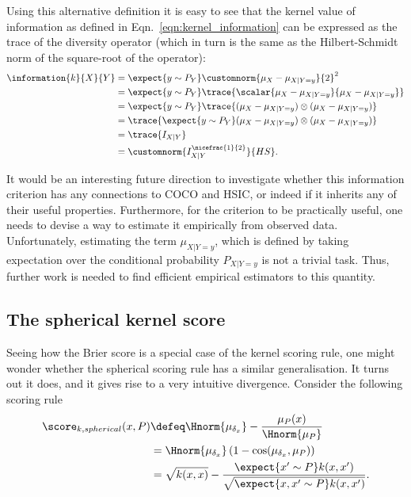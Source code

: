 Using this alternative definition it is easy to see that the kernel value of information as defined in Eqn.\ \eqref{eqn:kernel_information} can be expressed as the trace of the diversity operator (which in turn is the same as the Hilbert-Schmidt norm of the square-root of the operator):
%
\begin{align}
	\information{k}{X}{Y} &= \expect{y \sim P_{Y}} \customnorm{\mu_X - \mu_{X\vert Y=y}}{2}^2\\
		&= \expect{y \sim P_{Y}} \trace{\scalar{\mu_X - \mu_{X\vert Y=y}}{\mu_X - \mu_{X\vert Y=y}}}\\
		&= \expect{y \sim P_{Y}} \trace{ ( \mu_X - \mu_{X\vert Y=y}) \otimes (\mu_X - \mu_{X\vert Y=y})}\\
		&= \trace{ \expect{y \sim P_{Y}} ( \mu_X - \mu_{X\vert Y=y}) \otimes (\mu_X - \mu_{X\vert Y=y})} \\
		&= \trace{I_{X\vert Y}}\\
		&= \customnorm{I_{X\vert Y}^{\nicefrac{1}{2}}}{HS}.
\end{align}

It would be an interesting future direction to investigate whether this information criterion has any connections to COCO and HSIC, or indeed if it inherits any of their useful properties. Furthermore, for the criterion to be practically useful, one needs to devise a way to estimate it empirically from observed data. Unfortunately, estimating the term $\mu_{X\vert Y=y}$, which is defined by taking expectation over the conditional probability $P_{X\vert Y=y}$ is not a trivial task. Thus, further work is needed to find efficient empirical estimators to this quantity.

\subsection{The spherical kernel score\label{sec:spherical_kernel_score}}

Seeing how the Brier score is a special case of the kernel scoring rule, one might wonder whether the spherical scoring rule has a similar generalisation. It turns out it does, and it gives rise to a very intuitive divergence. Consider the following scoring rule
%
\begin{align}
	\score_{k,spherical}(x,P) &\defeq \Hnorm{\mu_{\delta_x}} - \frac{\mu_P(x)}{\Hnorm{\mu_P}} \label{eqn:spherical_kernel_score}\\
			& = \Hnorm{\mu_{\delta_x}}\left(1 - \cos(\mu_{\delta_x},\mu_{P})\right)\\
		& =\sqrt{k(x,x)} - \frac{\expect{x'\sim P}k(x,x')}{\sqrt{\expect{x,x'\sim P}k(x,x')}}.
\end{align}

